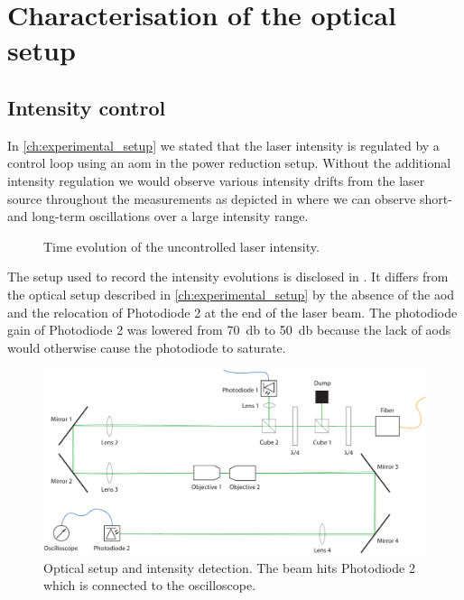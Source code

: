 \chapter{Characterisation of the optical setup}\label{ch:optical_setup}

\section{Intensity control}

In \cref{ch:experimental_setup} we stated that the laser intensity is
regulated by a control loop using an \gls{aom} in the power reduction setup.
Without the additional intensity regulation we would
observe various intensity drifts from the laser source throughout the
measurements as depicted in  where we can
observe short- and long-term oscillations over a large intensity range.
\begin{figure}[htb]
  \centering
  \begin{adjustbox}{width=\textwidth}
    
  \end{adjustbox}
  \caption{Time evolution of the uncontrolled laser intensity.
  }\label{fig:intensity_uncontrolled}
\end{figure}
The setup used to record the intensity evolutions is disclosed in
. It differs from the optical setup
described in \cref{ch:experimental_setup} by the absence of the \gls{aod}
and the relocation of Photodiode 2 at the end of the laser beam. The
photodiode gain of Photodiode 2 was lowered from \SI{70}{\decibel} to
\SI{50}{\decibel} because the lack of \gls{aod}s would otherwise cause the
photodiode to saturate.
\begin{figure}[htb]
  \centering
  \includegraphics[width=\textwidth]{../media/setup/intensity-control.pdf}
  \caption{Optical setup and intensity detection. The beam hits Photodiode 2
    which is connected to the oscilloscope.
  }\label{fig:intensity_control_setup}
\end{figure}
